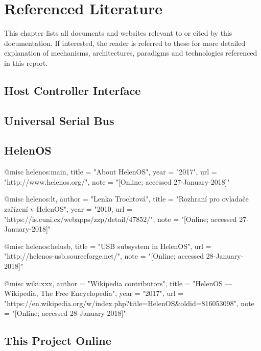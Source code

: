 \chapter{Referenced Literature}

This chapter lists all documents and websites relevant to or cited by this
documentation. If interested, the reader is referred to these for more detailed
explanation of mechanisms, architectures, paradigms and technologies referenced
in this report.


\section{Host Controller Interface}



\section{Universal Serial Bus}



\section{HelenOS}

@misc{ helenos:main,
    title = "About HelenOS",
    year = "2017",
    url = "http://www.helenos.org/",
    note = "[Online; accessed 27-January-2018]"
  }

@misc{ helenos:lt,
    author = "Lenka Trochtová",
    title = "Rozhraní pro ovladače zařízení v HelenOS",
    year = "2010,
    url = "https://is.cuni.cz/webapps/zzp/detail/47852/",
    note = "[Online; accessed 27-January-2018]"
  }

@misc{ helenos:helusb,
    title = "USB subsystem in HelenOS",
    url = "http://helenos-usb.sourceforge.net/",
    note = "[Online; accessed 28-January-2018]"
  }

@misc{ wiki:xxx,
    author = "Wikipedia contributors",
    title = "HelenOS --- Wikipedia{,} The Free Encyclopedia",
    year = "2017",
    url = "https://en.wikipedia.org/w/index.php?title=HelenOS\&oldid=816053098",
    note = "[Online; accessed 28-January-2018]"
  }

\section{This Project Online}



